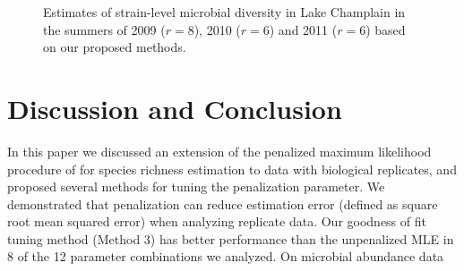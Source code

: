 \documentclass[oupdraft]{bio}
\begin{document}

\begin{figure}[t]
\caption{Estimates of strain-level microbial diversity in Lake Champlain in the summers of 2009 ($r = 8$), 2010 ($r = 6$) and 2011 ($r = 6$) based on our proposed methods.
%
\label{fig:data_analysis}}
\centering{}
\end{figure}




\section{Discussion and Conclusion}
\label{sec:discussion}

In this paper we discussed an extension of the penalized maximum likelihood procedure of \citet{wang_2005} for species richness estimation to data with biological replicates, and proposed several methods for tuning the penalization parameter.  We demonstrated that penalization can reduce estimation error (defined as square root mean squared error) when analyzing replicate data.  Our goodness of fit tuning method (Method 3) has better performance than the unpenalized MLE in 8 of the 12 parameter combinations we analyzed. On microbial abundance data 
\end{document}
